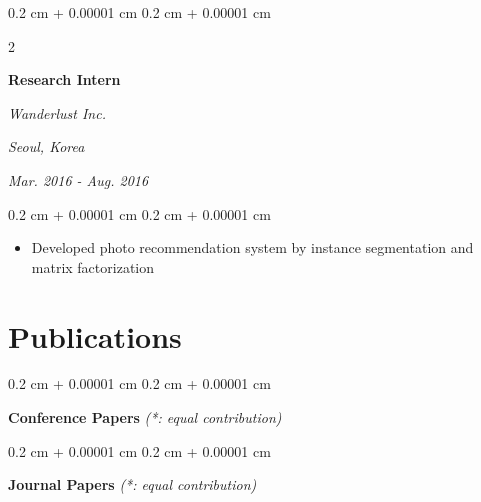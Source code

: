 \documentclass[10pt, letterpaper]{article}
\newenvironment{highlights}{
    \begin{itemize}[
        topsep=0.10 cm,
        parsep=0.10 cm,
        partopsep=0pt,
        itemsep=0pt,
        leftmargin=0.4 cm + 10pt
    ]
}{
    \end{itemize}
} %
\newenvironment{onecolentry}{
    \begin{adjustwidth}{
        0.2 cm + 0.00001 cm
    }{
        0.2 cm + 0.00001 cm
    }
}{
    \end{adjustwidth}
} %
\newenvironment{twocolentry}[2][]{
    \onecolentry
    \def\secondColumn{#2}
    \setcolumnwidth{\fill, 4.5 cm}
    \begin{paracol}{2}
}{
    \switchcolumn \raggedleft \secondColumn
    \end{paracol}
    \endonecolentry
} %
\begin{document}
        \vspace{0.2 cm}

        \begin{twocolentry}{
        \textit{Seoul, Korea}    
            
        \textit{Mar. 2016 - Aug. 2016}}
            \textbf{Research Intern}
            
            \textit{Wanderlust Inc.}
        \end{twocolentry}

        \vspace{0.10 cm}
        \begin{onecolentry}
            \begin{highlights}
                \item Developed photo recommendation system by instance segmentation and matrix factorization
            \end{highlights}
        \end{onecolentry}



    
    \section{Publications}

    \nocite{*}
    \vspace{5pt}
    \begin{onecolentry}
        \hspace{-5pt}\textbf{Conference Papers} \hspace{5pt} \textit{(*: equal contribution)}
    \end{onecolentry}
    \vspace{-5pt}
    
\begin{refcontext}[sorting=ddnt]
\printbibliography[
  heading=none,
  check=annoteconf,
  resetnumbers=true
]
\end{refcontext}



    \begin{onecolentry}
        \hspace{-5pt}\textbf{Journal Papers} \hspace{5pt} \textit{(*: equal contribution)}
    \end{onecolentry}
    \vspace{-5pt}
\end{document}
